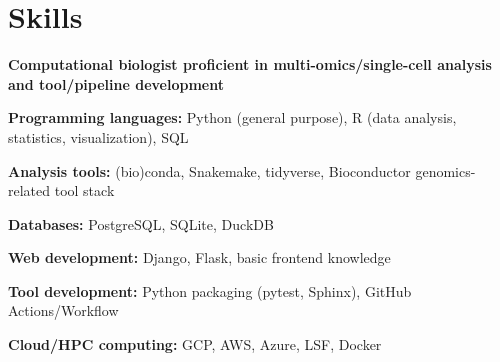 \section{Skills}

{
    \bfseries\color{color-title}
    Computational biologist proficient in multi-omics/single-cell analysis and tool/pipeline development
}

\begin{entrylist}[itemsep=0.5ex]

\item \textbf{Programming languages:}
    Python (general purpose),
    R (data analysis, statistics, visualization),
    SQL

\item \textbf{Analysis tools:} (bio)conda, Snakemake, tidyverse, Bioconductor genomics-related tool stack

\item \textbf{Databases:} PostgreSQL, SQLite, DuckDB

\item \textbf{Web development:} Django, Flask, basic front\-end knowledge

\item \textbf{Tool development:} Python packaging (pytest, Sphinx), GitHub Actions/Workflow

\item \textbf{Cloud/HPC computing:} GCP, AWS, Azure, LSF, Docker

\end{entrylist}
